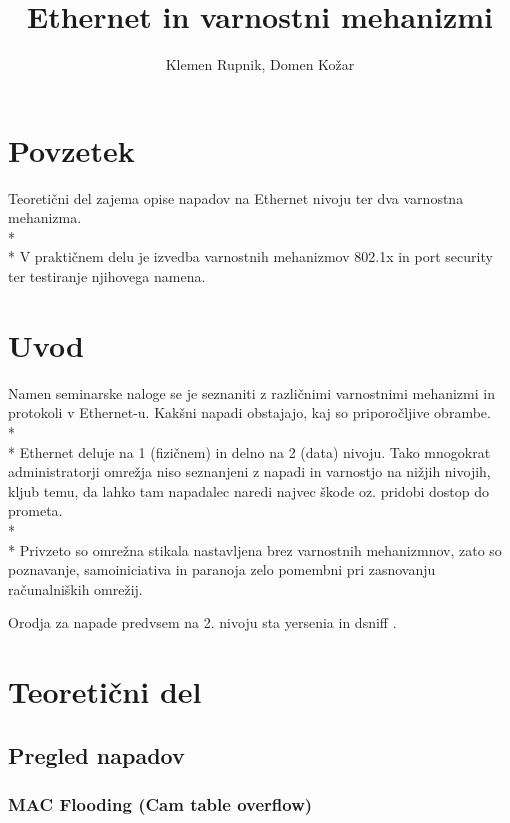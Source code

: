 \documentclass[12pt]{article}
\title{Ethernet in varnostni mehanizmi}
\author{Klemen Rupnik, Domen Kožar}
\let\stdsection\section
\renewcommand\section{\newpage\stdsection}
\begin{document}
\maketitle

\tableofcontents

\section{Povzetek}
Teoretični del zajema opise napadov na Ethernet nivoju ter dva varnostna mehanizma.
\\*
\\*
V praktičnem delu je izvedba varnostnih mehanizmov 802.1x in port security ter testiranje njihovega namena.

\section{Uvod}

Namen seminarske naloge se je seznaniti z različnimi varnostnimi mehanizmi in protokoli v Ethernet-u. Kakšni napadi obstajajo, kaj so priporočljive obrambe.
\\*
\\*
Ethernet deluje na 1 (fizičnem) in delno na 2 (data) nivoju. Tako mnogokrat administratorji omrežja niso seznanjeni z napadi in varnostjo na nižjih nivojih, kljub temu, da lahko tam napadalec naredi najvec škode oz. pridobi dostop do prometa. 
\\*
\\*
Privzeto so omrežna stikala nastavljena brez varnostnih mehanizmnov, zato so poznavanje, samoiniciativa in paranoja zelo pomembni pri zasnovanju računalniških omrežij.

Orodja za napade predvsem na 2. nivoju sta yersenia \cite{yersenia} in dsniff \cite{dsniff}.

\section{Teoretični del}

\subsection{Pregled napadov}
 
\subsubsection{MAC Flooding (Cam table overflow)}
\end{document}
